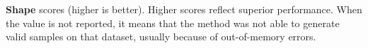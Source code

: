 \begin{table}[!t] 
    \centering
    \caption{\textbf{Shape} scores (higher is better). Higher scores reflect superior performance. When the value is not reported, it means that the method was not able to generate valid samples on that dataset, usually because of out-of-memory errors.
    } 
    \label{tbl:shape}
    \begin{threeparttable}
    {
    \resizebox{\columnwidth}{!}
    {

    
              }
              }
    \vspace{-5pt}
    \end{threeparttable}

\end{table}